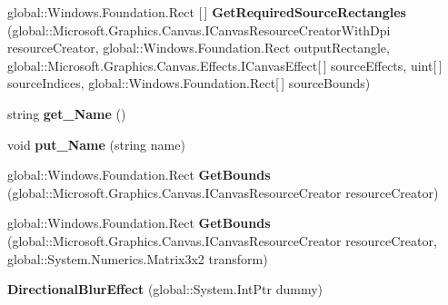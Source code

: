 \begin{DoxyCompactItemize}
global\+::\+Windows.\+Foundation.\+Rect \mbox{[}$\,$\mbox{]} {\bfseries Get\+Required\+Source\+Rectangles} (global\+::\+Microsoft.\+Graphics.\+Canvas.\+I\+Canvas\+Resource\+Creator\+With\+Dpi resource\+Creator, global\+::\+Windows.\+Foundation.\+Rect output\+Rectangle, global\+::\+Microsoft.\+Graphics.\+Canvas.\+Effects.\+I\+Canvas\+Effect\mbox{[}$\,$\mbox{]} source\+Effects, uint\mbox{[}$\,$\mbox{]} source\+Indices, global\+::\+Windows.\+Foundation.\+Rect\mbox{[}$\,$\mbox{]} source\+Bounds)
\item 
\mbox{\label{class_microsoft_1_1_graphics_1_1_canvas_1_1_effects_1_1_directional_blur_effect_ab4d58f6515fc6592f357910fc8e97458}} 
string {\bfseries get\+\_\+\+Name} ()
\item 
\mbox{\label{class_microsoft_1_1_graphics_1_1_canvas_1_1_effects_1_1_directional_blur_effect_a4b13502da797a16d2154abba3fc65f50}} 
void {\bfseries put\+\_\+\+Name} (string name)
\item 
\mbox{\label{class_microsoft_1_1_graphics_1_1_canvas_1_1_effects_1_1_directional_blur_effect_ad8347e784aa6e6582222d02840320dc2}} 
global\+::\+Windows.\+Foundation.\+Rect {\bfseries Get\+Bounds} (global\+::\+Microsoft.\+Graphics.\+Canvas.\+I\+Canvas\+Resource\+Creator resource\+Creator)
\item 
\mbox{\label{class_microsoft_1_1_graphics_1_1_canvas_1_1_effects_1_1_directional_blur_effect_a3137686f00a07e07d6981f2a8816c3c1}} 
global\+::\+Windows.\+Foundation.\+Rect {\bfseries Get\+Bounds} (global\+::\+Microsoft.\+Graphics.\+Canvas.\+I\+Canvas\+Resource\+Creator resource\+Creator, global\+::\+System.\+Numerics.\+Matrix3x2 transform)
\item 
\mbox{\label{class_microsoft_1_1_graphics_1_1_canvas_1_1_effects_1_1_directional_blur_effect_aca330745fdae8062acfb902b9cf55db1}} 
{\bfseries Directional\+Blur\+Effect} (global\+::\+System.\+Int\+Ptr dummy)
\item 
\mbox{\label{class_microsoft_1_1_graphics_1_1_canvas_1_1_effects_1_1_directional_blur_effect_aaa6e87737de12565ab452869f4ad7497}} 

\end{DoxyCompactItemize}

